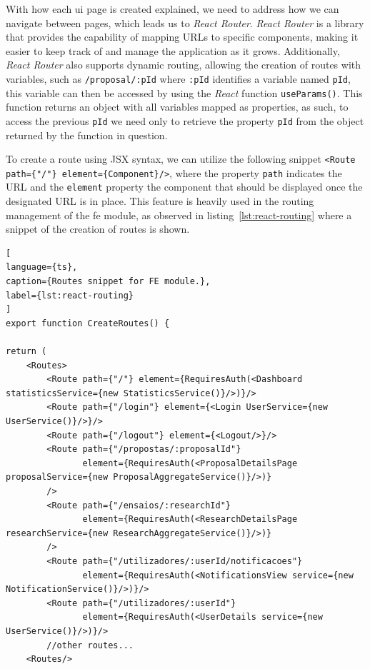 With how each \acrshort{ui} page is created explained, we need to address how we can navigate between pages, which leads us to \textit{React Router}. \textit{React Router} is a library that provides the capability of mapping URLs to specific components, making it easier to keep track of and manage the application as it grows. Additionally, \textit{React Router} also supports dynamic routing, allowing the creation of routes with variables, such as \lstinline[keywordstyle=\color{black},commentstyle=\color{black},stringstyle=\color{black}]{/proposal/:pId} where \lstinline{:pId} identifies a variable named \lstinline{pId}, this variable can then be accessed by using the \textit{React} function \lstinline{useParams()}. This function returns an object with all variables mapped as properties, as such, to access the previous \lstinline{pId} we need only to retrieve the property \lstinline{pId} from the object returned by the function in question.

To create a route using JSX syntax, we can utilize the following snippet \lstinline[keywordstyle=\color{black},commentstyle=\color{black},stringstyle=\color{black}]!<Route path={"/"} element={Component}/>!, where the property \lstinline{path} indicates the URL and the \lstinline{element} property the component that should be displayed once the designated URL is in place.
This feature is heavily used in the routing management of the \acrshort{fe} module, as observed in listing~\ref{lst:react-routing} where a snippet of the creation of routes is shown. 

\begin{lstlisting}[
language={ts},
caption={Routes snippet for FE module.},
label={lst:react-routing}
]
export function CreateRoutes() {

return (
    <Routes>
        <Route path={"/"} element={RequiresAuth(<Dashboard statisticsService={new StatisticsService()}/>)}/>
        <Route path={"/login"} element={<Login UserService={new UserService()}/>}/>
        <Route path={"/logout"} element={<Logout/>}/>
        <Route path={"/propostas/:proposalId"}
               element={RequiresAuth(<ProposalDetailsPage proposalService={new ProposalAggregateService()}/>)}
        />
        <Route path={"/ensaios/:researchId"}
               element={RequiresAuth(<ResearchDetailsPage researchService={new ResearchAggregateService()}/>)}
        />
        <Route path={"/utilizadores/:userId/notificacoes"}
               element={RequiresAuth(<NotificationsView service={new NotificationService()}/>)}/>
        <Route path={"/utilizadores/:userId"}
               element={RequiresAuth(<UserDetails service={new UserService()}/>)}/>
        //other routes...
    <Routes/>
\end{lstlisting}

